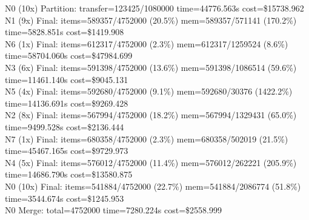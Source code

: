\documentclass[]{interact}
\theoremstyle{plain}
\theoremstyle{definition}
\theoremstyle{remark}
\begin{document}
N0 (10x) Partition: transfer=123425/1080000 time=44776.563\textmu s cost=\$15738.962\\
N1 (9x) Final: items=589357/4752000 (20.5\%) mem=589357/571141 (170.2\%) time=5828.851\textmu s cost=\$1419.908\\
N6 (1x) Final: items=612317/4752000 (2.3\%) mem=612317/1259524 (8.6\%) time=58704.060\textmu s cost=\$47984.699\\
N3 (6x) Final: items=591398/4752000 (13.6\%) mem=591398/1086514 (59.6\%) time=11461.140\textmu s cost=\$9045.131\\
N5 (4x) Final: items=592680/4752000 (9.1\%) mem=592680/30376 (1422.2\%) time=14136.691\textmu s cost=\$9269.428\\
N2 (8x) Final: items=567994/4752000 (18.2\%) mem=567994/1329431 (65.0\%) time=9499.528\textmu s cost=\$2136.444\\
N7 (1x) Final: items=680358/4752000 (2.3\%) mem=680358/502019 (21.5\%) time=45467.165\textmu s cost=\$9729.973\\
N4 (5x) Final: items=576012/4752000 (11.4\%) mem=576012/262221 (205.9\%) time=14686.790\textmu s cost=\$13580.875\\
N0 (10x) Final: items=541884/4752000 (22.7\%) mem=541884/2086774 (51.8\%) time=3544.674\textmu s cost=\$1245.953\\
N0 Merge: total=4752000 time=7280.224\textmu s cost=\$2558.999
\end{document}
